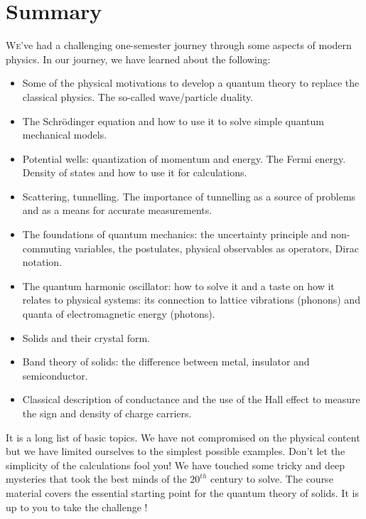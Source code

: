 \documentclass{Textbook}
\begin{document}
\chapter{Summary}
\lettrine[lines=3,slope=6pt,nindent=6pt]{\initfamily W}{e}'ve had a challenging one-semester journey through some aspects of modern physics. In our journey, we have learned about the following:
\begin{itemize}
\item Some of the physical motivations to develop a quantum theory to replace the classical physics. The so-called wave/particle duality.
\item The Schr{\"o}dinger equation and how to use it to solve simple quantum mechanical models.
\item Potential wells: quantization of momentum and energy. The Fermi energy. Density of states and how to use it for calculations.
\item Scattering, tunnelling. The importance of tunnelling as a source of problems and as a means for accurate measurements.
\item The foundations of quantum mechanics: the uncertainty principle and non-commuting variables, the postulates, physical observables as operators, Dirac notation.
\item The quantum harmonic oscillator: how to solve it and a taste on how it relates to physical systems: its connection to lattice vibrations (phonons) and quanta of electromagnetic energy (photons).
\item Solids and their crystal form.
\item Band theory of solids: the difference between metal, insulator and semiconductor.
\item Classical description of conductance and the use of the Hall effect to measure the sign and density of charge carriers.
\end{itemize}


\noindent It is a long list of basic topics. We have not compromised on the physical content but we have limited ourselves to the simplest possible examples. Don't let the simplicity of the calculations fool you! We have touched some tricky and deep mysteries that took the best minds of the $20^{th}$ century to solve. The course material covers the essential starting point for the quantum theory of solids. It is up to you to take the challenge !
\end{document}
